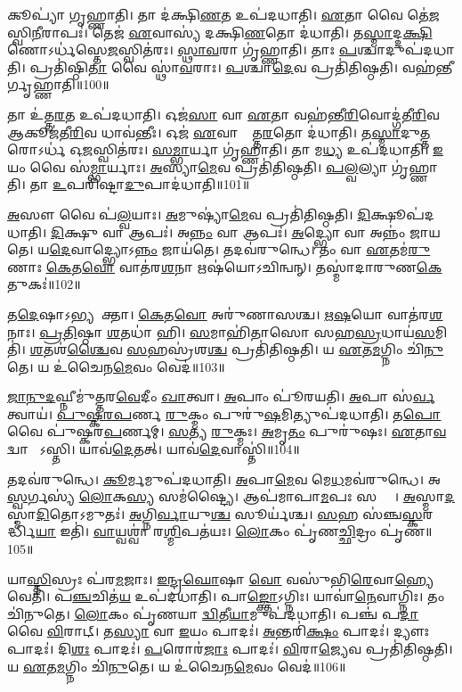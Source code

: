 𑌕𑍂𑌪𑍍𑌯𑌾॑ 𑌗𑍃𑌹𑍍𑌣𑌾𑌤𑌿। 𑌤𑌾 𑌦॑𑌕𑍍𑌷𑌿\ul{𑌣}𑌤 𑌉𑌪॑𑌦𑌧𑌾𑌤𑌿। 
\ul{𑌏}𑌤𑌾 𑌵𑍈 𑌤𑍇॑\ul{𑌜}𑌸𑍍𑌵𑌿\ul{𑌨𑍀}𑌰𑌾𑌪𑌃॑। 𑌤𑍇𑌜॑ \ul{𑌏}𑌵𑌾𑌸𑍍𑌯॑ 𑌦𑌕𑍍𑌷𑌿\ul{𑌣}𑌤𑍋 𑌦॑𑌧𑌾𑌤𑌿। 
𑌤\ul{𑌸𑍍𑌮𑌾}𑌦𑍍𑌦\ul{𑌕𑍍𑌷𑌿}𑌣𑍋𑌽𑌰𑍍𑌧॑𑌸𑍍𑌤𑍇\ul{𑌜}𑌸𑍍𑌵𑌿𑌤॑𑌰𑌃। \ul{𑌸𑍍𑌥𑌾}\ul{𑌵}𑌰𑌾 𑌗𑍃॑𑌹𑍍𑌣𑌾𑌤𑌿। 
𑌤𑌾𑌃 \ul{𑌪}𑌶𑍍𑌚𑌾𑌦𑍁𑌪॑𑌦𑌧𑌾𑌤𑌿। 𑌪𑍍𑌰𑌤𑌿॑𑌷𑍍𑌠𑌿\ul{𑌤𑌾} 𑌵𑍈 𑌸𑍍𑌥𑌾॑\ul{𑌵}𑌰𑌾𑌃। 
\ul{𑌪}𑌶𑍍𑌚𑌾\ul{𑌦𑍇}𑌵 𑌪𑍍𑌰𑌤𑌿॑𑌤𑌿𑌷𑍍𑌠𑌤𑌿। 𑌵𑌹॑𑌨𑍍𑌤𑍀𑌰𑍍𑌗𑍃𑌹𑍍𑌣𑌾𑌤𑌿॥100॥


𑌤𑌾 𑌉॑𑌤𑍍𑌤\ul{𑌰}𑌤 𑌉𑌪॑𑌦𑌧𑌾𑌤𑌿। 𑌓𑌜॑\ul{𑌸𑌾} 𑌵𑌾 \ul{𑌏}𑌤𑌾 𑌵𑌹॑𑌨𑍍𑌤𑍀\ul{𑌰𑌿}𑌵𑍋𑌦𑍍𑌗॑𑌤𑍀\ul{𑌰𑌿}𑌵 𑌆𑌕𑍂𑌜॑𑌤𑍀\ul{𑌰𑌿}𑌵 𑌧𑌾𑌵॑𑌨𑍍𑌤𑍀𑌃। 
𑌓𑌜॑ \ul{𑌏}𑌵𑌾𑌸𑍍𑌯𑍋᳚𑌤𑍍𑌤\ul{𑌰}𑌤𑍋 𑌦॑𑌧𑌾𑌤𑌿। 𑌤\ul{𑌸𑍍𑌮𑌾}𑌦𑍁\ul{𑌤𑍍𑌤}𑌰𑍋𑌽𑌰𑍍𑌧॑ 𑌓\ul{𑌜}𑌸𑍍𑌵𑌿𑌤॑𑌰𑌃। 
\ul{𑌸}\ul{𑌮𑍍𑌭𑌾}𑌰𑍍𑌯𑌾 𑌗𑍃॑𑌹𑍍𑌣𑌾𑌤𑌿। 𑌤𑌾 𑌮\ul{𑌧𑍍𑌯} 𑌉𑌪॑𑌦𑌧𑌾𑌤𑌿। 
\ul{𑌇}𑌯𑌂 𑌵𑍈 𑌸॑\ul{𑌮𑍍𑌭𑌾}𑌰𑍍𑌯𑌾𑌃। \ul{𑌅}𑌸𑍍𑌯𑌾\ul{𑌮𑍇}𑌵 𑌪𑍍𑌰𑌤𑌿॑𑌤𑌿𑌷𑍍𑌠𑌤𑌿। 
\ul{𑌪}\ul{𑌲𑍍𑌵}𑌲𑍍𑌯𑌾 𑌗𑍃॑𑌹𑍍𑌣𑌾𑌤𑌿। 𑌤𑌾 \ul{𑌉}𑌪𑌰𑌿॑𑌷𑍍𑌟𑌾\ul{𑌦𑍁}𑌪𑌾𑌦॑𑌧𑌾𑌤𑌿॥101॥


\ul{𑌅}𑌸𑍗 𑌵𑍈 𑌪॑\ul{𑌲𑍍𑌵}𑌯𑌾𑌃। \ul{𑌅}𑌮𑍁𑌷𑍍𑌯𑌾॑\ul{𑌮𑍇}𑌵 𑌪𑍍𑌰𑌤𑌿॑𑌤𑌿𑌷𑍍𑌠𑌤𑌿। 
\ul{𑌦𑌿}𑌕𑍍𑌷𑍂𑌪॑𑌦𑌧𑌾𑌤𑌿। \ul{𑌦𑌿}𑌕𑍍𑌷𑍁 𑌵𑌾 𑌆𑌪𑌃॑। 
𑌅\ul{𑌨𑍍𑌨𑌂} 𑌵𑌾 𑌆𑌪𑌃॑। \ul{𑌅}𑌦𑍍𑌭𑍍𑌯𑍋 𑌵𑌾 𑌅𑌨𑍍𑌨𑌂॑ 𑌜𑌾𑌯𑌤𑍇। 
𑌯\ul{𑌦𑍇}𑌵𑌾𑌦𑍍𑌭𑍍𑌯𑍋𑌽\ul{𑌨𑍍𑌨𑌂} 𑌜𑌾𑌯॑𑌤𑍇। 𑌤𑌦𑌵॑𑌰𑍁𑌨𑍍𑌧𑍇। 
𑌤𑌂 𑌵𑌾 \ul{𑌏}𑌤𑌮॑\ul{𑌰𑍁}𑌣𑌾𑌃 \ul{𑌕𑍇}𑌤\ul{𑌵𑍋} 𑌵𑌾𑌤॑𑌰\ul{𑌶}𑌨𑌾 𑌋𑌷॑𑌯𑍋𑌽𑌚𑌿𑌨𑍍𑌵𑌨𑍍। 
𑌤𑌸𑍍𑌮𑌾॑𑌦𑌾𑌰𑍁𑌣\ul{𑌕𑍇}𑌤𑍁𑌕𑌃॑॥102॥


𑌤\ul{𑌦𑍇}𑌷𑌾𑌽𑌭𑍍𑌯𑌨𑍂᳚𑌕𑍍𑌤𑌾। \ul{𑌕𑍇}𑌤\ul{𑌵𑍋} 𑌅𑌰𑍁॑𑌣𑌾𑌸𑌶𑍍𑌚। 
\ul{𑌋}\ul{𑌷}𑌯𑍋 𑌵𑌾𑌤॑𑌰\ul{𑌶}𑌨𑌾𑌃। \ul{𑌪𑍍𑌰}\ul{𑌤𑌿}𑌷𑍍𑌠𑌾 \ul{𑌶}𑌤𑌧𑌾॑ 𑌹𑌿। 
\ul{𑌸}𑌮𑌾𑌹𑌿॑𑌤𑌾𑌸𑍋 𑌸𑌹\ul{𑌸𑍍𑌰}𑌧𑌾𑌯॑\ul{𑌸}𑌮𑌿𑌤𑌿॑। \ul{𑌶}𑌤𑌶॑\ul{𑌶𑍍𑌚𑍈}𑌵 \ul{𑌸}𑌹𑌸𑍍𑌰॑𑌶\ul{𑌶𑍍𑌚} 𑌪𑍍𑌰𑌤𑌿॑𑌤𑌿𑌷𑍍𑌠𑌤𑌿। 
𑌯 \ul{𑌏}𑌤\ul{𑌮}𑌗𑍍𑌨𑌿𑌂 𑌚𑌿॑\ul{𑌨𑍁}𑌤𑍇। 𑌯 𑌉॑𑌚𑍈𑌨\ul{𑌮𑍇}𑌵𑌂 𑌵𑍇𑌦॑॥103॥\anuvakamend


\ul{𑌜𑌾}\ul{𑌨𑍁}\ul{𑌦}𑌘𑍍𑌨𑍀𑌮𑍁॑𑌤𑍍𑌤𑌰\ul{𑌵𑍇}𑌦𑍀𑌂 \ul{𑌖𑌾}𑌤𑍍𑌵𑌾। \ul{𑌅}𑌪𑌾𑌂 𑌪𑍂॑𑌰𑌯𑌤𑌿। 
\ul{𑌅}𑌪𑌾 𑌸॑\ul{𑌰𑍍𑌵}𑌤𑍍𑌵𑌾𑌯॑। \ul{𑌪𑍁}\ul{𑌷𑍍𑌕}\ul{𑌰}\ul{𑌪}𑌰𑍍𑌣 \ul{𑌰𑍁}𑌕𑍍𑌮𑌂 𑌪𑍁𑌰𑍁॑\ul{𑌷}𑌮𑌿𑌤𑍍𑌯𑍁𑌪॑𑌦𑌧𑌾𑌤𑌿। 
𑌤\ul{𑌪𑍋} 𑌵𑍈 𑌪𑍁॑𑌷𑍍𑌕𑌰\ul{𑌪}𑌰𑍍𑌣𑌮𑍍‌। \ul{𑌸}𑌤𑍍𑌯 \ul{𑌰𑍁}𑌕𑍍𑌮𑌃। 
\ul{𑌅}𑌮𑍃\ul{𑌤𑌂} 𑌪𑍁𑌰𑍁॑𑌷𑌃। \ul{𑌏}𑌤𑌾\ul{𑌵}𑌦𑍍𑌵𑌾 𑌵𑌾᳚𑌽𑌸𑍍𑌤𑌿। 
𑌯𑌾𑌵॑\ul{𑌦𑍇}𑌤𑌤𑍍। 𑌯𑌾𑌵॑\ul{𑌦𑍇}𑌵𑌾𑌸𑍍𑌤𑌿॑॥104॥


𑌤𑌦𑌵॑𑌰𑍁𑌨𑍍𑌧𑍇। \ul{𑌕𑍂}𑌰𑍍𑌮𑌮𑍁𑌪॑𑌦𑌧𑌾𑌤𑌿। 
\ul{𑌅}𑌪𑌾\ul{𑌮𑍇}𑌵 𑌮𑍇\ul{𑌧}𑌮𑌵॑𑌰𑍁𑌨𑍍𑌧𑍇। 𑌅𑌥𑍋᳚ \ul{𑌸𑍍𑌵}𑌰𑍍𑌗𑌸𑍍𑌯॑ \ul{𑌲𑍋}𑌕\ul{𑌸𑍍𑌯} 𑌸𑌮॑𑌷𑍍𑌟𑍍𑌯𑍈। 
𑌆𑌪॑𑌮𑌾𑌪𑌾\ul{𑌮}𑌪𑌃 𑌸𑌰𑍍𑌵𑌾𑌃᳚। \ul{𑌅}𑌸𑍍𑌮𑌾\ul{𑌦}𑌸𑍍𑌮𑌾\ul{𑌦𑌿}𑌤𑍋𑌽𑌮𑍁𑌤𑌃॑। 
\ul{𑌅}𑌗𑍍𑌨𑌿\ul{𑌰𑍍𑌵𑌾}𑌯𑍁\ul{𑌶𑍍𑌚} 𑌸𑍂𑌰𑍍𑌯॑𑌶𑍍𑌚। \ul{𑌸}𑌹 𑌸॑𑌞𑍍𑌚\ul{𑌸𑍍𑌕}𑌰𑌰𑍍𑌦𑍍𑌧𑌿॑\ul{𑌯𑌾} 𑌇𑌤𑌿॑। 
\ul{𑌵𑌾}𑌯𑍍𑌵𑌶𑍍𑌵𑌾॑ 𑌰\ul{𑌶𑍍𑌮𑌿}𑌪𑌤॑𑌯𑌃। \ul{𑌲𑍋}𑌕𑌂 𑌪𑍃॑𑌣\ul{𑌚𑍍𑌛𑌿}𑌦𑍍𑌰𑌂 𑌪𑍃॑𑌣॥105॥


𑌯𑌾\ul{𑌸𑍍𑌤𑌿}𑌸𑍍𑌰𑌃 𑌪॑𑌰\ul{𑌮}𑌜𑌾𑌃। \ul{𑌇}\ul{𑌨𑍍𑌦𑍍𑌰}\ul{𑌘𑍋}𑌷𑌾 \ul{𑌵𑍋} 𑌵𑌸𑍁॑𑌭𑌿\ul{𑌰𑍇}𑌵𑌾\ul{𑌹𑍍𑌯𑍇}𑌵𑍇𑌤𑌿॑। 
𑌪\ul{𑌞𑍍𑌚}𑌚𑌿𑌤॑\ul{𑌯} 𑌉𑌪॑𑌦𑌧𑌾𑌤𑌿। 𑌪𑌾\ul{𑌙𑍍𑌕𑍍𑌤𑍋}𑌽𑌗𑍍𑌨𑌿𑌃। 
𑌯𑌾𑌵𑌾॑\ul{𑌨𑍇}𑌵𑌾𑌗𑍍𑌨𑌿𑌃। 𑌤𑌂 𑌚𑌿॑𑌨𑍁𑌤𑍇। 
\ul{𑌲𑍋}𑌕𑌂 𑌪𑍃॑𑌣𑌯𑌾 \ul{𑌦𑍍𑌵𑌿}𑌤𑍀\ul{𑌯𑌾}𑌮𑍁𑌪॑𑌦𑌧𑌾𑌤𑌿। 𑌪𑌞𑍍𑌚॑ 𑌪\ul{𑌦𑌾} 𑌵𑍈 \ul{𑌵𑌿}𑌰𑌾𑌟𑍍‌। 
𑌤\ul{𑌸𑍍𑌯𑌾} 𑌵𑌾 \ul{𑌇}𑌯𑌂 𑌪𑌾𑌦𑌃॑। \ul{𑌅}𑌨𑍍𑌤𑌰𑌿॑\ul{𑌕𑍍𑌷𑌂} 𑌪𑌾𑌦𑌃॑। 𑌦𑍍𑌯𑍗𑌃 𑌪𑌾𑌦𑌃॑। 
𑌦𑌿\ul{𑌶𑌃} 𑌪𑌾𑌦𑌃॑। \ul{𑌪}𑌰𑍋𑌰॑\ul{𑌜𑌾𑌃} 𑌪𑌾𑌦𑌃॑। \ul{𑌵𑌿}𑌰𑌾\ul{𑌜𑍍𑌯𑍇}𑌵 𑌪𑍍𑌰𑌤𑌿॑𑌤𑌿𑌷𑍍𑌠𑌤𑌿। 
𑌯 \ul{𑌏}𑌤\ul{𑌮}𑌗𑍍𑌨𑌿𑌂 𑌚𑌿॑\ul{𑌨𑍁}𑌤𑍇। 𑌯 𑌉॑𑌚𑍈𑌨\ul{𑌮𑍇}𑌵𑌂 𑌵𑍇𑌦॑॥106॥\anuvakamend


